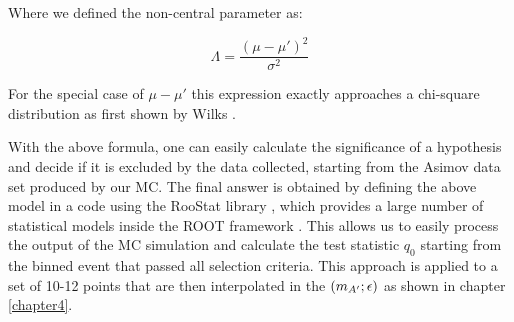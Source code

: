 Where we defined the non-central parameter as:

\begin{equation}
  \label{eq:non-central-par}
  \Lambda = \frac{(\mu - \mu')^2}{\sigma^2}
\end{equation}

For the special case of $\mu - \mu'$ this expression exactly approaches a chi-square distribution as first shown by Wilks \cite{10.2307/2957648}. 

With the above formula, one can easily calculate the significance of a hypothesis and decide if it is excluded by the data collected, starting from the Asimov data set produced by our MC. The final answer is obtained by defining the above model in a code using the RooStat library \cite{moneta2010roostats}, which provides a large number of statistical models inside the ROOT framework \cite{root}. This allows us to easily process the output of the MC simulation and calculate the test statistic $q_0$ starting from the binned event that passed all selection criteria. This approach is applied to a set of 10-12 points that are then interpolated in the $(m_{A'};\epsilon)$ as shown in chapter \ref{chapter4}.

